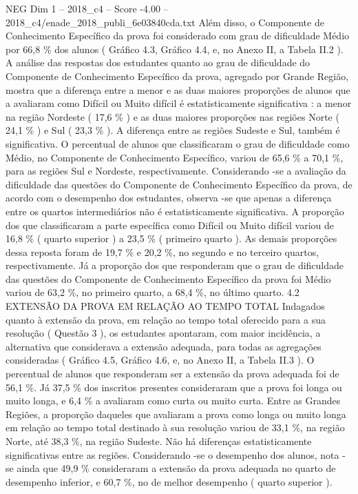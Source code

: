 \begin{textsample}{NEG Dim 1 – 2018\_c4 – Score -4.00 – 2018\_c4/enade\_2018\_publi\_6e03840cda.txt}
Além disso, o Componente de Conhecimento Específico da prova foi considerado com grau de dificuldade Médio por 66,8 \% dos alunos ( Gráfico 4.3, Gráfico 4.4, e, no Anexo II, a Tabela II.2 ).
A análise das respostas dos estudantes quanto ao grau de dificuldade do Componente de Conhecimento Específico da prova, agregado por Grande Região, mostra que a diferença entre a menor e as duas maiores proporções de alunos que a avaliaram como Difícil ou Muito difícil é estatisticamente significativa : a menor na região Nordeste ( 17,6 \% ) e as duas maiores proporções nas regiões Norte ( 24,1 \% ) e Sul ( 23,3 \% ).
A diferença entre as regiões Sudeste e Sul, também é significativa.
O percentual de alunos que classificaram o grau de dificuldade como Médio, no Componente de Conhecimento Específico, variou de 65,6 \% a 70,1 \%, para as regiões Sul e Nordeste, respectivamente.
Considerando -se a avaliação da dificuldade das questões do Componente de Conhecimento Específico da prova, de acordo com o desempenho dos estudantes, observa -se que apenas a diferença entre os quartos intermediários não é estatisticamente significativa.
A proporção dos que classificaram a parte específica como Difícil ou Muito difícil variou de 16,8 \% ( quarto superior ) a 23,5 \% ( primeiro quarto ).
As demais proporções dessa reposta foram de 19,7 \% e 20,2 \%, no segundo e no terceiro quartos, respectivamente.
Já a proporção dos que responderam que o grau de dificuldade das questões do Componente de Conhecimento Específico da prova foi Médio variou de 63,2 \%, no primeiro quarto, a 68,4 \%, no último quarto. 4.2 EXTENSÃO DA PROVA EM RELAÇÃO AO TEMPO TOTAL Indagados quanto à extensão da prova, em relação ao tempo total oferecido para a sua resolução ( Questão 3 ), os estudantes apontaram, com maior incidência, a alternativa que considerava a extensão adequada, para todas as agregações consideradas ( Gráfico 4.5, Gráfico 4.6, e, no Anexo II, a Tabela II.3 ).
O percentual de alunos que responderam ser a extensão da prova adequada foi de 56,1 \%.
Já 37,5 \% dos inscritos presentes consideraram que a prova foi longa ou muito longa, e 6,4 \% a avaliaram como curta ou muito curta.
Entre as Grandes Regiões, a proporção daqueles que avaliaram a prova como longa ou muito longa em relação ao tempo total destinado à sua resolução variou de 33,1 \%, na região Norte, até 38,3 \%, na região Sudeste.
Não há diferenças estatisticamente significativas entre as regiões.
Considerando -se o desempenho dos alunos, nota -se ainda que 49,9 \% consideraram a extensão da prova adequada no quarto de desempenho inferior, e 60,7 \%, no de melhor desempenho ( quarto superior ).

\end{textsample}
